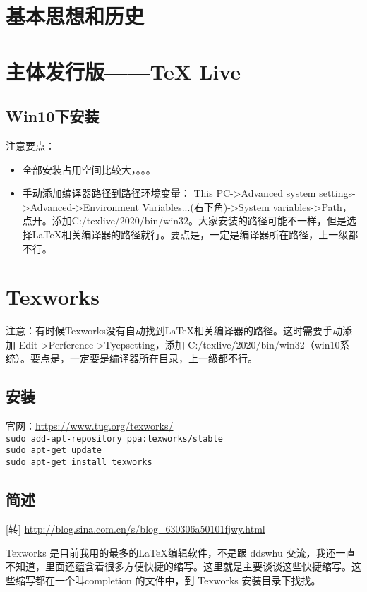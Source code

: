 \section{基本思想和历史}



\section{主体发行版——\TeX{} Live }
\subsection{Win10下安装}
注意要点：
\begin{itemize}
\item 全部安装占用空间比较大，。。。
\item 手动添加编译器路径到路径环境变量：
This PC->Advanced system settings->Advanced->Environment Variables...(右下角)->System variables->Path，点开。添加C:/texlive/2020/bin/win32。大家安装的路径可能不一样，但是选择\LaTeX{}相关编译器的路径就行。要点是，一定是编译器所在路径，上一级都不行。
\end{itemize}




\section{Texworks}
注意：有时候Texworks没有自动找到\LaTeX{}相关编译器的路径。这时需要手动添加
Edit->Perference->Tyepsetting，添加
C:/texlive/2020/bin/win32（win10系统）。要点是，一定要是编译器所在目录，上一级都不行。


\subsection{安装}
官网：\url{https://www.tug.org/texworks/}\\
\verb|sudo add-apt-repository ppa:texworks/stable|\\
\verb|sudo apt-get update|\\
\verb|sudo apt-get install texworks|


\subsection{简述}
[转] \url{http://blog.sina.com.cn/s/blog_630306a50101fjwy.html}

Texworks 是目前我用的最多的\LaTeX 编辑软件，不是跟 ddswhu 交流，我还一直不知道，里面还蕴含着很多方便快捷的缩写。这里就是主要谈谈这些快捷缩写。这些缩写都在一个叫completion 的文件中，到 Texworks 安装目录下找找。

